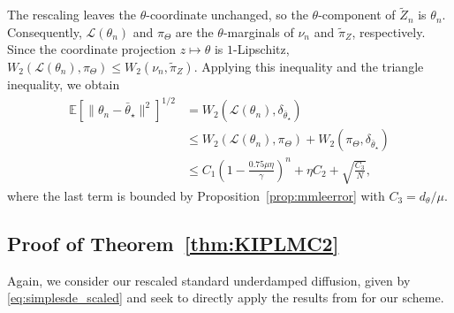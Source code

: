 The rescaling leaves the $\theta$-coordinate unchanged, so the $\theta$-component of $\widetilde Z_n$ is $\theta_n$. Consequently, $\mathcal L(\theta_n)$ and $\pi_\Theta$ are the $\theta$-marginals of $\nu_n$ and $\widetilde\pi_Z$, respectively. Since the coordinate projection $z\mapsto\theta$ is $1$-Lipschitz, $W_2(\mathcal L(\theta_n),\pi_\Theta)\leq W_2(\nu_n,\widetilde\pi_Z)$. Applying this inequality and the triangle inequality, we obtain
\small
\begin{align*}
\mathbb{E}[\|\theta_n-\bar{\theta}_\star\|^2]^{1/2} &= W_2(\mathcal{L}(\theta_n), \delta_{\bar{\theta}_\star})\\
&\leq W_2(\mathcal{L}(\theta_n), \pi_\Theta) + W_2(\pi_\Theta, \delta_{\bar{\theta}_\star})\\
&\leq C_1 \left(1-\frac{0.75 \mu\eta}{\gamma}\right)^n + \eta C_2 + \sqrt{\frac{C_3}{N}},
\end{align*}
\normalsize
where the last term is bounded by Proposition~\ref{prop:mmleerror} with $C_3=d_\theta/\mu$.

\subsection{Proof of Theorem~\ref{thm:KIPLMC2}}\label{app:proofnumericalKPLMC2}
Again, we consider our rescaled standard underdamped diffusion, given by \eqref{eq:simplesde_scaled} and seek to directly apply the results from \citep{monmarche2021high} for our scheme.

